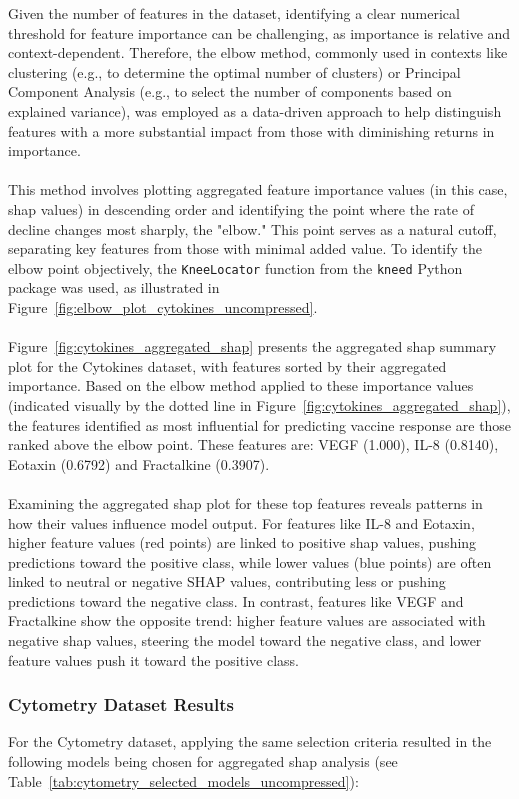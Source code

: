 \documentclass[12pt,a4paper]{report}
\begin{document}
\noindent
Given the number of features in the dataset, identifying a clear numerical threshold for feature importance can be challenging, as importance is relative and context-dependent. Therefore, the elbow method, commonly used in contexts like clustering (e.g., to determine the optimal number of clusters) or Principal Component Analysis (e.g., to select the number of components based on explained variance), was employed as a data-driven approach to help distinguish features with a more substantial impact from those with diminishing returns in importance.\\
\\
This method involves plotting aggregated feature importance values (in this case, \gls{shap} values) in descending order and identifying the point where the rate of decline changes most sharply, the "elbow." This point serves as a natural cutoff, separating key features from those with minimal added value. To identify the elbow point objectively, the \texttt{KneeLocator} function from the \texttt{kneed} Python package was used, as illustrated in Figure~\ref{fig:elbow_plot_cytokines_uncompressed}.\\
\\
Figure~\ref{fig:cytokines_aggregated_shap} presents the aggregated \gls{shap} summary plot for the Cytokines dataset, with features sorted by their aggregated importance. Based on the elbow method applied to these importance values (indicated visually by the dotted line in Figure~\ref{fig:cytokines_aggregated_shap}), the features identified as most influential for predicting vaccine response are those ranked above the elbow point. These features are: VEGF (1.000), IL-8 (0.8140), Eotaxin (0.6792) and Fractalkine (0.3907).\\
\\
Examining the aggregated \gls{shap} plot for these top features reveals patterns in how their values influence model output. For features like IL-8 and Eotaxin, higher feature values (red points) are linked to positive \gls{shap} values, pushing predictions toward the positive class, while lower values (blue points) are often linked to neutral or negative SHAP values, contributing less or pushing predictions toward the negative class. In contrast, features like VEGF and Fractalkine show the opposite trend: higher feature values are associated with negative \gls{shap} values, steering the model toward the negative class, and lower feature values push it toward the positive class.

\subsubsection*{Cytometry Dataset Results}
For the Cytometry dataset, applying the same selection criteria resulted in the following models being chosen for aggregated \gls{shap} analysis (see Table~\ref{tab:cytometry_selected_models_uncompressed}):\\
\end{document}
